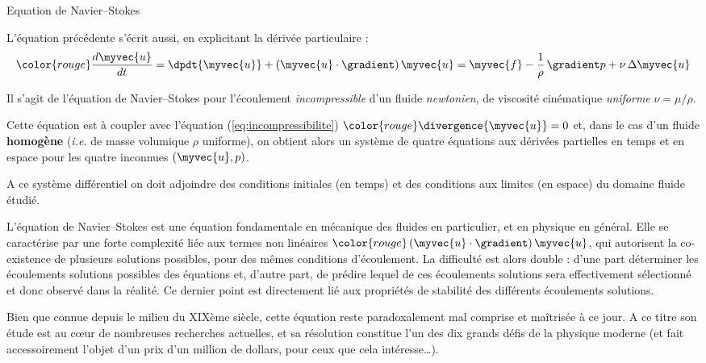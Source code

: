 \begin{frame}{Equation de Navier--Stokes}

\small

L'équation précédente s'écrit aussi, en explicitant la dérivée particulaire :
\begin{equation}
	\color{rouge}
	\frac{d\myvec{u}}{dt} 
	= 
	\dpdt{\myvec{u}} + \left ( \myvec{u} \cdot \gradient \right )\myvec{u}
	=
	\myvec{f}
	-
	\frac{1}{\rho} \, \gradient p
	+
	\nu \, \Delta \myvec{u} 
	\label{eq:Navier-Stokes}
\end{equation}


Il s'agit de l'équation de \textcolor{vert}{Navier--Stokes} pour l'écoulement 
\textsl{incompressible} 
d'un fluide \textsl{newtonien}, de viscosité cinématique \textsl{uniforme} $\nu = \mu/\rho$.

\pause
\medskip

Cette équation est à coupler avec l'équation (\ref{eq:incompressibilite}) $\color{rouge} \divergence{\myvec{u}} = 0$ et, dans le cas d'un fluide \textbf{homogène} 
(\textit{i.e.} de masse volumique $\rho$ uniforme), 
on obtient alors un système de quatre équations aux dérivées partielles en temps et en espace
pour les quatre inconnues $(\myvec{u}, p)$.

\medskip

A ce système différentiel on doit adjoindre des \textcolor{vert}{conditions initiales} (en temps)
et des \textcolor{vert}{conditions aux limites} (en espace) du domaine fluide étudié. 

\medskip
\pause

L'équation de Navier--Stokes est une équation fondamentale en mécanique des fluides 
en particulier, et en physique en général. 
Elle se caractérise par une forte complexité liée aux termes non linéaires
$\color{rouge} \left ( \myvec{u} \cdot \gradient \right )\myvec{u}$, qui autorisent 
la co-existence de plusieurs
solutions possibles, pour des mêmes conditions d'écoulement.
La difficulté est alors double : d'une part déterminer les écoulements solutions possibles 
des équations et, d'autre part, de prédire lequel de ces écoulements solutions 
sera effectivement sélectionné et donc observé dans la réalité. 
Ce dernier point est directement lié aux propriétés de stabilité 
des différents écoulements solutions.

\medskip

Bien que connue depuis le milieu du XIXème siècle, cette équation reste paradoxalement 
mal comprise et maîtrisée à ce jour. 
A ce titre son étude est au c{\oe}ur de nombreuses recherches actuelles, et 
sa résolution constitue l'un des dix grands défis de la physique moderne 
(et fait accessoirement l'objet d'un prix d'un million de dollars, 
pour ceux que cela intéresse\ldots). 

\vspace{0mm}

\end{frame}

